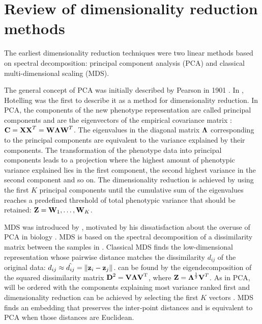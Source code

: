 \section{Review of dimensionality reduction methods}
\label{section:DimReduction-methods}
The earliest dimensionality reduction techniques were two linear methods based on spectral decomposition: principal component analysis (PCA) and classical multi-dimensional scaling (MDS). 

The general concept of PCA was initially described by Pearson in 1901 \citep{Pearson1901}. In  \parencite*{Hotelling1933}, Hotelling was the first to describe it as a method for dimensionality reduction. In PCA, the components of the new phenotype representation are called principal components and are the eigenvectors  of the empirical covariance matrix :  \(\boldsymbol{\mathbf{C}}=\boldsymbol{\mathbf{X}}\boldsymbol{\mathbf{X}}^T = \boldsymbol{\mathbf{W}}\boldsymbol{\mathbf{\Lambda}}\boldsymbol{\mathbf{W}}^T\). The eigenvalues in the diagonal matrix \(\boldsymbol{\mathbf{\Lambda}}\) corresponding to the principal components are equivalent to the variance explained by their components. The transformation of the phenotype data into principal components leads to a projection where the highest amount of phenotypic variance explained lies in the first component, the second highest variance in the second component and so on. The dimensionality reduction is achieved by using the first \(K\) principal components until the cumulative sum of the eigenvalues reaches a predefined threshold of total phenotypic variance that should be retained: \(\boldsymbol{\mathbf{Z}}={\boldsymbol{\mathbf{W}}_{1}, \dots, \boldsymbol{\mathbf{W}}_{K}}\). 
 
MDS was introduced by \citet{Gower1966}, motivated by his dissatisfaction about the overuse of PCA in biology  . MDS is based on the spectral decomposition of a dissimilarity matrix  between the samples in . Classical MDS finds the low-dimensional representation  whose pairwise distance matches the dissimilarity \(d_{ij}\) of the original data: \(d_{ij} \approx \hat{d_{ij}} = \lVert \boldsymbol{\mathbf{z}}_{i} - \boldsymbol{\mathbf{z}}_{j}\rVert \).  can be found by the eigendecomposition of the squared dissimilarity matrix \(\boldsymbol{\mathbf{D}}^\text{2} = \boldsymbol{\mathbf{V}}\boldsymbol{\mathbf{\Lambda}}\boldsymbol{\mathbf{V}}^\text{T}\), where \(\boldsymbol{\mathbf{Z}}=\boldsymbol{\mathbf{\Lambda}}^\frac{1}{2}\boldsymbol{\mathbf{V}}^T\). As in PCA,  will be ordered with the components explaining most variance ranked first and dimensionality reduction can be achieved by selecting the first \(K\) vectors \citep{Gower1966}. MDS finds an embedding that preserves the inter‐point distances and is equivalent to PCA when those distances are Euclidean.

